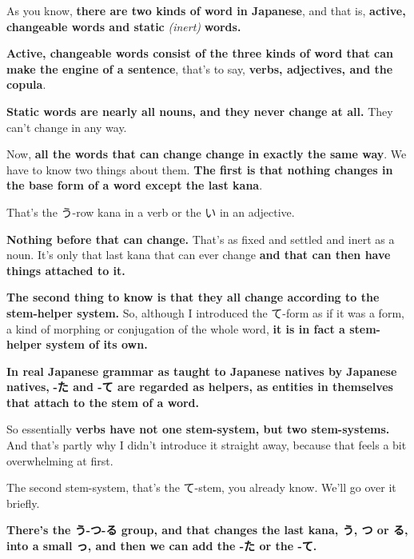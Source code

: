 As you know, {\bf there are two kinds of word in Japanese}, and that is, {\bf active, changeable words and static} {\em (inert)} {\bf words.}

{}

{\bf Active, changeable words consist of the three kinds of word that can make the engine of a sentence}, that's to say, {\bf verbs, adjectives, and the copula}.

{\bf Static words are nearly all nouns, and they never change at all.} They can't change in any way.

\thinrule

Now, {\bf all the words that can change change in exactly the same way}. We have to know two things about them. {\bf The first is that nothing changes in the base form of a word except the last kana}.

That's the う-row kana in a verb or the い in an adjective.

{}

{\bf Nothing before that can change.} That's as fixed and settled and inert as a noun. It's only that last kana that can ever change {\bf and that can then have things attached to it.}

{\bf The second thing to know is that they all change according to the stem-helper system.} So, although I introduced the て-form as if it was a form, a kind of morphing or conjugation of the whole word, {\bf it is in fact a stem-helper system of its own.}

{\bf In real Japanese grammar as taught to Japanese natives by Japanese natives,} {\bf -た and -て are regarded as helpers, as entities in themselves that attach to the stem of a word.}

{}

So essentially {\bf verbs have not one stem-system, but two stem-systems.} And that's partly why I didn't introduce it straight away, because that feels a bit overwhelming at first.

\stopsectionlevel

\startsectionlevel[title={The て-stem system},reference={the-て-stem-system}]

The second stem-system, that's the て-stem, you already know. We'll go over it briefly.

\startsectionlevel[title={う-つ-る group},reference={う-つ-る-group}]

{\bf There's the う-つ-る group, and that changes the last kana, う, つ or る,} {\bf into a small っ, and then we can add the -た or the -て.}

